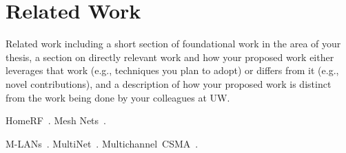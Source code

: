 \section{Related Work}
\label{sec:related}
Related work including a short section of foundational work in the
area of your thesis, a section on directly relevant work and how your
proposed work either leverages that work (e.g., techniques you plan to
adopt) or differs from it (e.g., novel contributions), and a description
of how your proposed work is distinct from the work being done by your
colleagues at UW.

HomeRF~\cite{nagus_homerf}. Mesh Nets~\cite{whitehead_mesh}.

M-LANs~\cite{marsan_multichan}. MultiNet~\cite{chandra_multinet}. Multichannel~CSMA~\cite{nasipuri_multichan}.